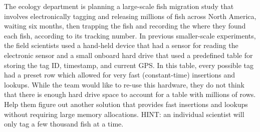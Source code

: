 \documentclass[12pt]{article}
\begin{document}
\renewcommand{\headrulewidth}{0.5pt}

\phantom{Test}

The ecology department is planning a large-scale fish migration study that
involves electronically tagging and releasing millions of fish across North
America, waiting six months, then trapping the fish and recording the where
they found each fish, according to its tracking number. In previous
smaller-scale experiments, the field scientists used a hand-held device that
had a sensor for reading the electronic sensor and a small onboard hard drive
that used a predefined table for storing the tag ID, timestamp, and current
GPS. In this table, every possible tag had a preset row which allowed for very
fast (constant-time) insertions and lookups. While the team would like to
re-use this hardware, they do not think that there is enough hard drive space
to account for a table with millions of rows. Help them figure out another
solution that provides fast insertions and lookups without requiring large
memory allocations. HINT: an individual scientist will only tag a few thousand
fish at a time.


\pagebreak

\newpage
\mbox{}
\newpage
\pagebreak
\end{document}
